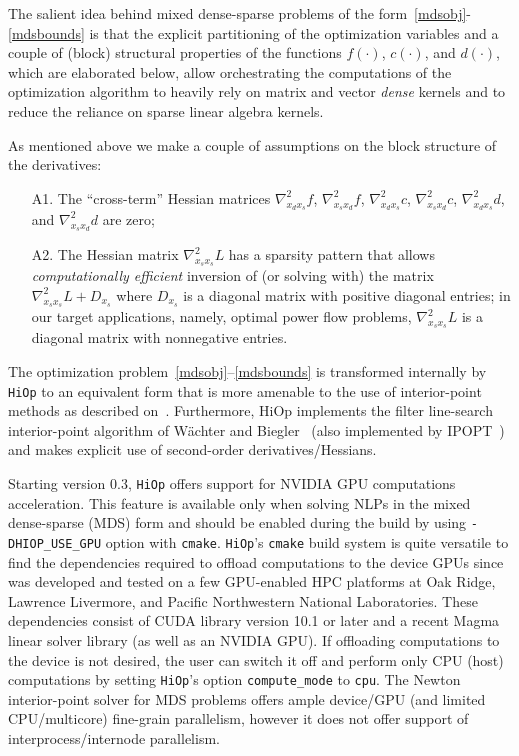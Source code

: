 \documentclass[11pt]{article}
\newcounter{line}
\newcommand{\Hi}{\texttt{HiOp}\xspace}
\begin{document}
The salient idea behind mixed dense-sparse problems of the form~\eqref{mdsobj}-\eqref{mdsbounds} is that the explicit partitioning of the optimization variables and a couple of (block) structural properties of the functions $f(\cdot)$, $c(\cdot)$, and $d(\cdot)$, which are elaborated below, allow orchestrating the computations of the optimization algorithm to heavily rely on matrix and vector \textit{dense} kernels and to reduce the reliance on sparse linear algebra kernels.

As mentioned above we make a couple of assumptions on the block structure of the derivatives:
\begin{itemize}
    \item[A1.] The ``cross-term'' Hessian matrices $\nabla^2_{x_d x_s} f$, $\nabla^2_{x_s x_d} f$, $\nabla^2_{x_d x_s} c$, $\nabla^2_{x_s x_d} c$, $\nabla^2_{x_d x_s} d$, and $\nabla^2_{x_s x_d} d$ are zero;
    \item[A2.] The Hessian matrix $\nabla^2_{x_s x_s} L$ has a sparsity pattern that allows \textit{computationally efficient} inversion of (or solving with) the matrix $\nabla^2_{x_s x_s} L + D_{x_s}$ where $D_{x_s}$ is a diagonal matrix with positive diagonal entries; in our target applications, namely, optimal power flow problems, $\nabla^2_{x_s x_s} L$ is a diagonal matrix with nonnegative entries.
\end{itemize}

The optimization problem~\eqref{mdsobj}--\eqref{mdsbounds} is transformed internally by \Hi to an equivalent form that is more amenable to the use of interior-point methods as described on~\cite[Section~3]{petra2019memory}. Furthermore, HiOp implements the filter line-search interior-point algorithm of W{\"a}chter and Biegler~\cite{waecther_05_ipopt,waecther_05_ipopt2} (also implemented by IPOPT~\cite{waecther_05_ipopt0}) and makes explicit use of second-order derivatives/Hessians.

Starting version 0.3, \Hi offers support for NVIDIA GPU computations acceleration. This feature is available only when solving NLPs in the mixed dense-sparse (MDS) form and should be enabled during the build by using \texttt{-DHIOP\_USE\_GPU} option with \texttt{cmake}. \Hi's \texttt{cmake} build system is quite versatile to find the dependencies required to offload computations to the device GPUs since was developed and tested on a few GPU-enabled HPC platforms at Oak Ridge, Lawrence Livermore, and Pacific Northwestern National Laboratories. These dependencies consist of CUDA library version 10.1 or later and a recent Magma linear solver library (as well as an NVIDIA GPU). If offloading computations to the device is not desired, the user can switch it off and perform only CPU (host) computations by setting \Hi's option \texttt{compute\_mode} to \texttt{cpu}. The Newton interior-point solver for MDS problems offers ample device/GPU (and limited CPU/multicore) fine-grain parallelism, however it does not offer support of interprocess/internode parallelism.
\end{document}
